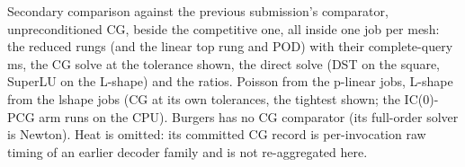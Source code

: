 \begin{table}[h]
\centering
\caption{Secondary comparison against the previous submission's comparator,
unpreconditioned CG, beside the competitive one, all inside one job per
mesh: the reduced rungs (and the linear top rung and POD) with their
complete-query ms, the CG solve at the tolerance shown, the direct solve
(DST on the square, SuperLU on the L-shape) and the ratios. Poisson from
the p-linear jobs, L-shape from the lshape jobs (CG at its own tolerances,
the tightest shown; the IC(0)-PCG arm runs on the CPU). Burgers has no CG
comparator (its full-order solver is Newton). Heat is omitted: its
committed CG record is per-invocation raw timing of an earlier decoder
family and is not re-aggregated here.}
\label{tab:cg}
\resizebox{\linewidth}{!}{}
\end{table}

